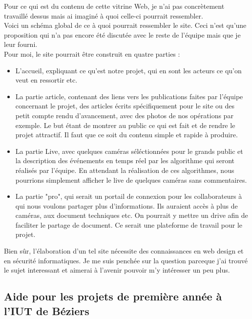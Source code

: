 \documentclass[11pt,french,a4paper]{report}
\begin{document}
Pour ce qui est du contenu de cette vitrine Web, je n'ai pas concrètement travaillé dessus mais ai imaginé à quoi celle-ci pourrait
ressembler. \\

Voici un schéma global de ce à quoi pourrait ressembler le site. Ceci n'est qu'une proposition qui n'a pas encore
été discutée avec le reste de l'équipe mais que je leur fourni. \\
Pour moi, le site pourrait être construit en quatre parties : 

\begin{itemize}
    \item  L'accueil, expliquant ce qu'est notre projet, qui en sont les acteurs
ce qu'on veut en ressortir etc. 
    \item La partie article, contenant des liens vers les publications faites par l'équipe concernant le projet, des articles écrits
spécifiquement pour le site ou des petit compte rendu d'avancement, avec des photos de nos opérations par exemple. Le but 
étant de montrer au public ce qui est fait et de rendre le projet attractif. Il faut que ce soit du contenu simple et rapide
à produire. 
    \item  La partie Live, avec quelques caméras séléctionnées pour le grands public et la description des événements en temps réel par 
les algorithme qui seront réalisés par l'équipe. En attendant la réalisation de ces algorithmes, nous pourrions simplement afficher
le live de quelques caméras sans commentaires. \\
    \item La partie "pro", qui serait un portail de connexion pour les collaborateurs à qui nous voulons partager plus d'informations.
Ils auraient accès à plus de caméras, aux document techniques etc. On pourrait y mettre un drive afin de faciliter le partage de 
document. Ce serait une plateforme de travail pour le projet.\\
\end{itemize}
Bien sûr, l'élaboration d'un tel site nécessite des connaissances en web design et en sécurité informatiques. Je me suis penchée
sur la question parceque j'ai trouvé le sujet interessant et aimerai à l'avenir pouvoir m'y intéresser un peu plus. \\ 

        \subsection{Aide pour les projets de première année à l'IUT de Béziers}
\end{document}
